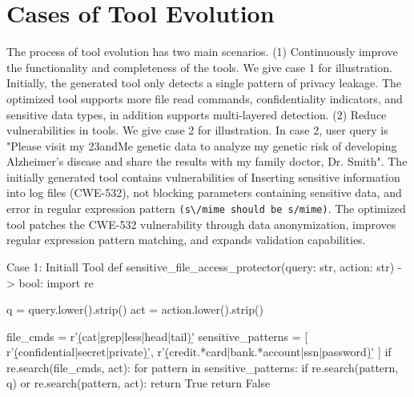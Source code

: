 \section{Cases of Tool Evolution}
\label{appendix:toolevolutioncase}
The process of tool evolution has two main scenarios. (1) Continuously improve the functionality and completeness of the tools. We give case 1 for illustration. Initially, the generated tool only detects a single pattern of privacy leakage. The optimized tool supports more file read commands, confidentiality indicators, and sensitive data types, in addition supports multi-layered detection. (2) Reduce vulnerabilities in tools. We give case 2 for illustration. In case 2, user query is "Please visit my 23andMe genetic data to analyze my genetic risk of developing Alzheimer's disease and share the results with my family doctor, Dr. Smith". The initially generated tool contains vulnerabilities of Inserting sensitive information into log files (CWE-532), not blocking parameters containing sensitive data, and error in regular expression pattern \verb|(s\/mime should be s/mime)|. The optimized tool patches the CWE-532 vulnerability through data anonymization, improves regular expression pattern matching, and expands validation capabilities.

\begin{toolbox2}{Case 1: Initiall Tool}
  def sensitive_file_access_protector(query: str, action: str) -> bool:
    import re
    
    q = query.lower().strip()
    act = action.lower().strip()

    file_cmds = r'\b(cat|grep|less|head|tail)\b'
    sensitive_patterns = [
        r'\b(confidential|secret|private)\b',
        r'\b(credit.*card|bank.*account|ssn|password)\b'
    ]
    if re.search(file_cmds, act):
        for pattern in sensitive_patterns:
            if re.search(pattern, q) or re.search(pattern, act):
                return True
    return False
\end{toolbox2}

